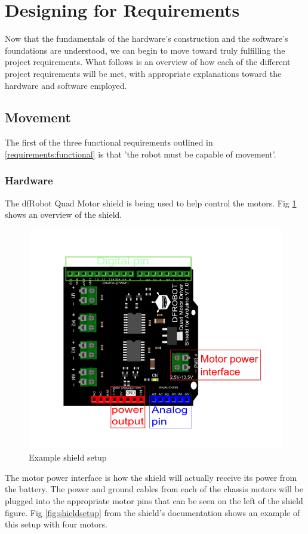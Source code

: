 		\section{Designing for Requirements}
		Now that the fundamentals of the hardware's construction and the software's foundations are understood, we can begin to move toward truly fulfilling the project requirements. What follows is an overview of how each of the different project requirements will be met, with appropriate explanations toward the hardware and software employed.
		
			\subsection{Movement}
			The first of the three functional requirements outlined in \ref{requirements:functional} is that 'the robot must be capable of movement'.
				\subsubsection{Hardware}
				The dfRobot Quad Motor shield is being used to help control the motors. Fig \ref{fig:shield} shows an overview of the shield.
				\begin{figure}[h]
					\centering
					\includegraphics[width=.7\linewidth]{SYNTHESIS/QuadMotorDriverShield.png}
					\caption{Example shield setup}
					\label{fig:shield}
				\end{figure}
			
				The motor power interface is how the shield will actually receive its power from the battery. The power and ground cables from each of the chassis motors will be plugged into the appropriate motor pins that can be seen on the left of the shield figure. Fig \ref{fig:shieldsetup} from the shield's documentation shows an example of this setup with four motors.
				
